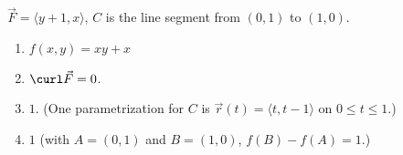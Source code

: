 {$\vec F = \langle y+1,x\rangle$, $C$ is the line segment from $(0,1)$ to $(1,0)$.
}
{\begin{enumerate}
\item		$f(x,y) = xy+x$
\item	$\curl \vec F = 0$.
\item		$1$. (One parametrization for $C$ is $\vec r(t) = \langle t,t-1\rangle$ on $0\leq t\leq 1$.)
\item	$1$ (with $A = (0,1)$ and $B = (1,0)$, $f(B) - f(A) = 1$.)
\end{enumerate}
}
